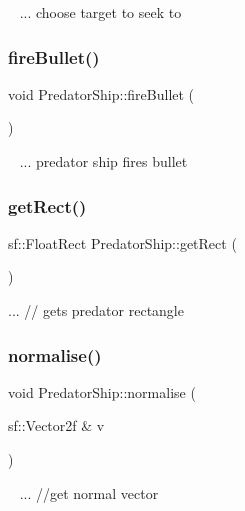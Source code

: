 ~\newline
... choose target to seek to\mbox{\label{class_predator_ship_aac64b6592bb9e75c34335f0150a68d12}} 
\subsubsection{\texorpdfstring{fire\+Bullet()}{fireBullet()}}
{\footnotesize\ttfamily void Predator\+Ship\+::fire\+Bullet (\begin{DoxyParamCaption}{ }\end{DoxyParamCaption})}

~\newline
... predator ship fires bullet\mbox{\label{class_predator_ship_a91fdb3bab56c53417c0fa33237768f64}} 
\subsubsection{\texorpdfstring{get\+Rect()}{getRect()}}
{\footnotesize\ttfamily sf\+::\+Float\+Rect Predator\+Ship\+::get\+Rect (\begin{DoxyParamCaption}{ }\end{DoxyParamCaption})}

... // gets predator rectangle\mbox{\label{class_predator_ship_ad240f08c5f508a3447452d665080cf73}} 
\subsubsection{\texorpdfstring{normalise()}{normalise()}}
{\footnotesize\ttfamily void Predator\+Ship\+::normalise (\begin{DoxyParamCaption}\item[{sf\+::\+Vector2f \&}]{v }\end{DoxyParamCaption})}

~\newline
... //get normal vector\mbox{\label{class_predator_ship_abd172d5ef1713de0e79e33ce7b23c13a}} 
